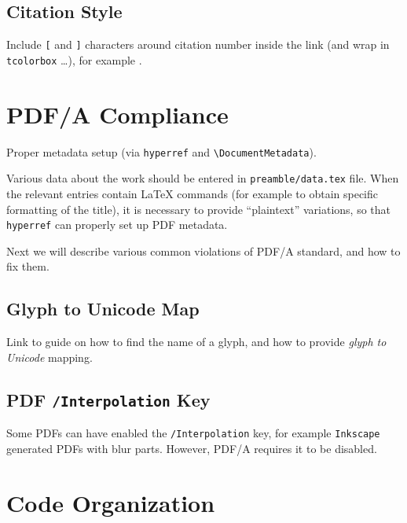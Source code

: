 \subsection{Citation Style}%
\label{sub:Citation Style}

Include \texttt{[} and \texttt{]} characters around citation number inside the link (and wrap in \texttt{tcolorbox} \ldots), for example \autocite{TeXtured}.


\section{PDF/A Compliance}%
\label{sec:PDF/A Compliance}

Proper metadata setup (via \texttt{hyperref} and \verb|\DocumentMetadata|).
\begin{remark}
    Various data about the work should be entered in \texttt{preamble/data.tex} file.
    When the relevant entries contain \LaTeX{} commands (for example to obtain specific formatting of the title), it is necessary to provide \enquote{plaintext} variations, so that \texttt{hyperref} can properly set up PDF metadata.
\end{remark}

Next we will describe various common violations of PDF/A standard, and how to fix them.

\subsection{Glyph to Unicode Map}%
\label{sub:Glyph to Unicode Map}

\begin{Todo}
    Link to guide on how to find the name of a glyph, and how to provide \emph{glyph to Unicode} mapping.
\end{Todo}

\subsection{PDF \texorpdfstring{\texttt{/Interpolation}}{/Interpolation} Key}%
\label{sub:PDF Interpolation Key}

Some PDFs can have enabled the \texttt{/Interpolation} key, for example \texttt{Inkscape} generated PDFs with blur parts.
However, PDF/A requires it to be disabled.


\section{Code Organization}%
\label{sec:Code Organization}

